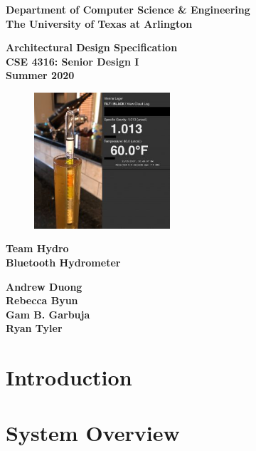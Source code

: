 \documentclass[11pt,letterpaper]{article}
\newcommand{\teamname}{Team Hydro}
\newcommand{\productname}{Bluetooth Hydrometer}
\newcommand{\coursename}{CSE 4316: Senior Design I}
\newcommand{\semester}{Summer 2020}
\newcommand{\docname}{Architectural Design Specification}
\newcommand{\department}{Department of Computer Science \& Engineering}
\newcommand{\university}{The University of Texas at Arlington}
\newcommand{\authors}{Andrew Duong\\ Rebecca Byun \\ Gam B. Garbuja \\ Ryan Tyler}
\begin{document}
{\centering \huge \color{accentcolor} \sc \textbf{\department \\ \university} \par}
\vspace{1 in}
{\centering \huge \color{accentcolor} \sc \textbf{\docname \\ \coursename \\ \semester} \par}
\vspace{0.5 in}
\begin{figure}[h!]
	\centering
   	\includegraphics[width=0.45\textwidth]{images/bluetooth_hydro}
\end{figure}
\vspace{0.5 in}
{\centering \huge \color{accentcolor} \sc \textbf{\teamname \\ \productname} \par}
\vspace{0.5 in}
{\centering \large \sc \textbf{\authors} \par}
\newpage



\begin{versionhistory}
\end{versionhistory}
\newpage

\setcounter{tocdepth}{2}
\tableofcontents
\newpage

\listoffigures
\listoftables
\newpage

\section{Introduction}

\newpage
\section{System Overview}

\newpage
\end{document}
